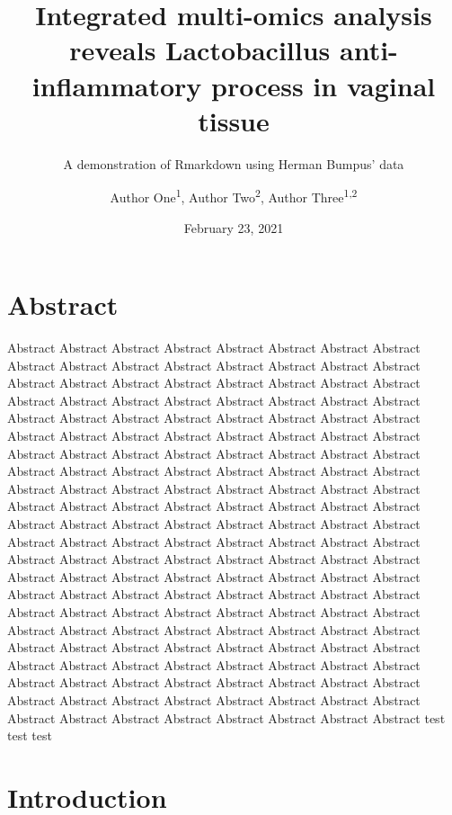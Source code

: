 \documentclass[
]{article}
\title{Integrated multi-omics analysis reveals Lactobacillus anti-inflammatory process in vaginal tissue}
\subtitle{A demonstration of Rmarkdown using Herman Bumpus' data}
\author{Author One\textsuperscript{1},
Author Two\textsuperscript{2},
Author Three\textsuperscript{1,2}}
\date{February 23, 2021}
\begin{document}
\maketitle


\hypertarget{abstract}{%
\section{Abstract}\label{abstract}}

Abstract Abstract Abstract Abstract Abstract Abstract Abstract Abstract Abstract Abstract Abstract Abstract Abstract Abstract Abstract Abstract Abstract Abstract Abstract Abstract Abstract Abstract Abstract Abstract Abstract Abstract Abstract Abstract Abstract Abstract Abstract Abstract Abstract Abstract Abstract Abstract Abstract Abstract Abstract Abstract Abstract Abstract Abstract Abstract Abstract Abstract Abstract Abstract Abstract Abstract Abstract Abstract Abstract Abstract Abstract Abstract Abstract Abstract Abstract Abstract Abstract Abstract Abstract Abstract Abstract Abstract Abstract Abstract Abstract Abstract Abstract Abstract Abstract Abstract Abstract Abstract Abstract Abstract Abstract Abstract Abstract Abstract Abstract Abstract Abstract Abstract Abstract Abstract Abstract Abstract Abstract Abstract Abstract Abstract Abstract Abstract Abstract Abstract Abstract Abstract Abstract Abstract Abstract Abstract Abstract Abstract Abstract Abstract Abstract Abstract Abstract Abstract Abstract Abstract Abstract Abstract Abstract Abstract Abstract Abstract Abstract Abstract Abstract Abstract Abstract Abstract Abstract Abstract Abstract Abstract Abstract Abstract Abstract Abstract Abstract Abstract Abstract Abstract Abstract Abstract Abstract Abstract Abstract Abstract Abstract Abstract Abstract Abstract Abstract Abstract Abstract Abstract Abstract Abstract Abstract Abstract Abstract Abstract Abstract Abstract Abstract Abstract Abstract Abstract Abstract Abstract Abstract Abstract Abstract Abstract Abstract Abstract Abstract Abstract Abstract Abstract
test test test

\clearpage

\hypertarget{introduction}{%
\section{Introduction}\label{introduction}}
\end{document}

